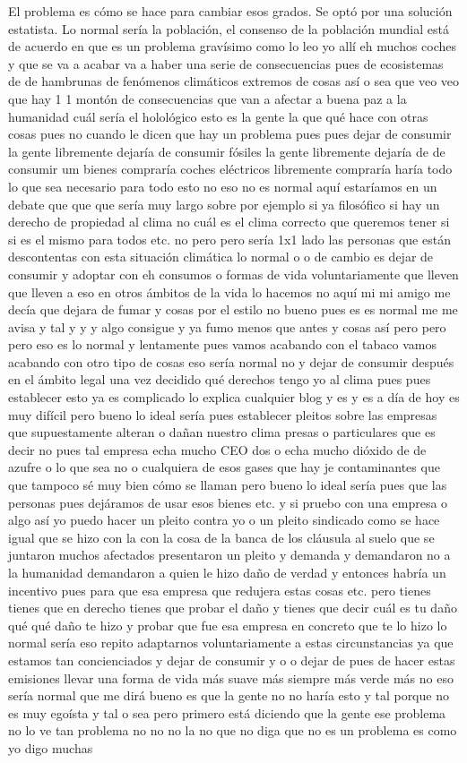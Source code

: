 El problema es cómo se hace para cambiar esos grados. Se optó por una solución estatista. Lo normal sería la población, el consenso de la población mundial está de acuerdo en que es un problema gravísimo como lo leo yo allí eh muchos coches y que se va a acabar va a haber una serie de consecuencias pues de ecosistemas de de hambrunas de fenómenos climáticos extremos de cosas así o sea que veo veo que hay 1 1 montón de consecuencias que van a afectar a buena paz a la humanidad cuál sería el holológico esto es la gente la que qué hace con otras cosas pues no cuando le dicen que hay un problema pues pues dejar de consumir la gente libremente dejaría de consumir fósiles la gente libremente dejaría de de consumir um bienes compraría coches eléctricos libremente compraría haría todo lo que sea necesario para todo esto no eso no es normal aquí estaríamos en un debate que que que sería muy largo sobre por ejemplo si ya filosófico si hay un derecho de propiedad al clima no cuál es el clima correcto que queremos tener si si es el mismo para todos etc. no pero pero sería 1x1 lado las personas que están descontentas con esta situación climática lo normal o o de cambio es dejar de consumir y adoptar con eh consumos o formas de vida voluntariamente que lleven que lleven a eso en otros ámbitos de la vida lo hacemos no aquí mi mi amigo me decía que dejara de fumar y cosas por el estilo no bueno pues es es normal me me avisa y tal y y y algo consigue y ya fumo menos que antes y cosas así pero pero pero eso es lo normal y lentamente pues vamos acabando con el tabaco vamos acabando con otro tipo de cosas eso sería normal no y dejar de consumir después en el ámbito legal una vez decidido qué derechos tengo yo al clima pues pues establecer esto ya es complicado lo explica cualquier blog y es y es a día de hoy es muy difícil pero bueno lo ideal sería pues establecer pleitos sobre las empresas que supuestamente alteran o dañan nuestro clima presas o particulares que es decir no pues tal empresa echa mucho CEO dos o echa mucho dióxido de de azufre o lo que sea no o cualquiera de esos gases que hay je contaminantes que que tampoco sé muy bien cómo se llaman pero bueno lo ideal sería pues que las personas pues dejáramos de usar esos bienes etc. y si pruebo con una empresa o algo así yo puedo hacer un pleito contra yo o un pleito sindicado como se hace igual que se hizo con la con la cosa de la banca de los cláusula al suelo que se juntaron muchos afectados presentaron un pleito y demanda y demandaron no a la humanidad demandaron a quien le hizo daño de verdad y entonces habría un incentivo pues para que esa empresa que redujera estas cosas etc. pero tienes tienes que en derecho tienes que probar el daño y tienes que decir cuál es tu daño qué qué daño te hizo y probar que fue esa empresa en concreto que te lo hizo lo normal sería eso repito adaptarnos voluntariamente a estas circunstancias ya que estamos tan concienciados y dejar de consumir y o o dejar de pues de hacer estas emisiones llevar una forma de vida más suave más siempre más verde más no eso sería normal que me dirá bueno es que la gente no no haría esto y tal porque no es muy egoísta y tal o sea pero primero está diciendo que la gente ese problema no lo ve tan problema no no no la no que no diga que no es un problema es como yo digo muchas 